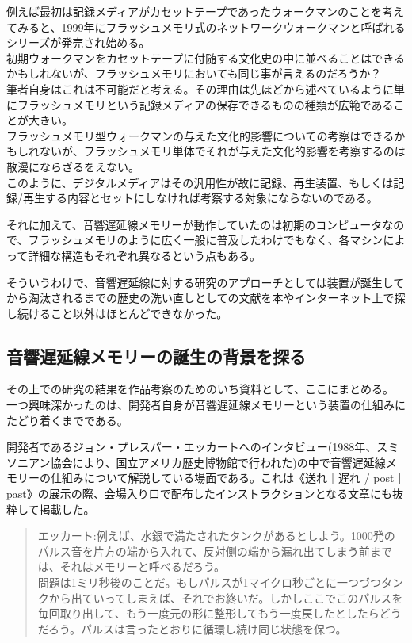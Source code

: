 \documentclass[a4paper,report]{jsbook}
\begin{document}
例えば最初は記録メディアがカセットテープであったウォークマンのことを考えてみると、1999年にフラッシュメモリ式のネットワークウォークマンと呼ばれるシリーズが発売され始める。\\
初期ウォークマンをカセットテープに付随する文化史の中に並べることはできるかもしれないが、フラッシュメモリにおいても同じ事が言えるのだろうか？\\
筆者自身はこれは不可能だと考える。その理由は先ほどから述べているように単にフラッシュメモリという記録メディアの保存できるものの種類が広範であることが大きい。\\
フラッシュメモリ型ウォークマンの与えた文化的影響についての考察はできるかもしれないが、フラッシュメモリ単体でそれが与えた文化的影響を考察するのは散漫にならざるをえない。\\
このように、デジタルメディアはその汎用性が故に記録、再生装置、もしくは記録/再生する内容とセットにしなければ考察する対象にならないのである。

それに加えて、音響遅延線メモリーが動作していたのは初期のコンピュータなので、フラッシュメモリのように広く一般に普及したわけでもなく、各マシンによって詳細な構造もそれぞれ異なるという点もある。

そういうわけで、音響遅延線に対する研究のアプローチとしては装置が誕生してから淘汰されるまでの歴史の洗い直しとしての文献を本やインターネット上で探し続けること以外はほとんどできなかった。

\subsection{音響遅延線メモリーの誕生の背景を探る}\label{ux97f3ux97ffux9045ux5ef6ux7ddaux30e1ux30e2ux30eaux30fcux306eux8a95ux751fux306eux80ccux666fux3092ux63a2ux308b}

その上での研究の結果を作品考察のためのいち資料として、ここにまとめる。\\
一つ興味深かったのは、開発者自身が音響遅延線メモリーという装置の仕組みにたどり着くまでである。

開発者であるジョン・プレスパー・エッカートへのインタビュー(1988年、スミソニアン協会により、国立アメリカ歴史博物館で行われた)の中で音響遅延線メモリーの仕組みについて解説している場面である。これは《送れ｜遅れ
/
post｜past》の展示の際、会場入り口で配布したインストラクションとなる文章にも抜粋して掲載した。

\begin{quote}
エッカート:例えば、水銀で満たされたタンクがあるとしよう。1000発のパルス音を片方の端から入れて、反対側の端から漏れ出てしまう前までは、それはメモリーと呼べるだろう。\\
問題は1ミリ秒後のことだ。もしパルスが1マイクロ秒ごとに一つづつタンクから出ていってしまえば、それでお終いだ。しかしここでこのパルスを毎回取り出して、もう一度元の形に整形してもう一度戻したとしたらどうだろう。パルスは言ったとおりに循環し続け同じ状態を保つ。
\end{quote}
\end{document}
